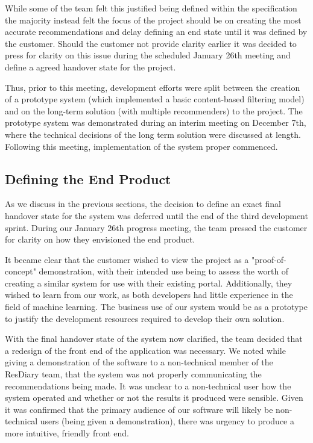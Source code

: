 \documentclass{l3proj}
\begin{document}
While some of the team felt this justified being defined within the specification the majority instead felt the focus of the project should be on creating the most accurate recommendations and delay defining an end state until it was defined by the customer. Should the customer not provide clarity earlier it was decided to press for clarity on this issue during the scheduled January 26th meeting and define a agreed handover state for the project. 

Thus, prior to this meeting, development efforts were split between the creation of a prototype system (which implemented a basic content-based filtering model) and on the long-term solution (with multiple recommenders) to the project. The prototype system was demonstrated during an interim meeting on December 7th, where the technical decisions of the long term solution were discussed at length. Following this meeting, implementation of the system proper commenced. 

\subsection{Defining the End Product}
\label{sec:jandefinedstate}

As we discuss in the previous sections, the decision to define an exact final handover state for the system was deferred until the end of the third development sprint. During our January 26th progress meeting, the team pressed the customer for clarity on how they envisioned the end product. 

It became clear that the customer wished to view the project as a "proof-of-concept" demonstration, with their intended use being to assess the worth of creating a similar system for use with their existing portal. Additionally, they wished to learn from our work, as both developers had little experience in the field of machine learning. The business use of our system would be as a prototype to justify the development resources required to develop their own solution.

With the final handover state of the system now clarified, the team decided that a redesign of the front end of the application was necessary. We noted while giving a demonstration of the software to a non-technical member of the ResDiary team, that the system was not properly communicating the recommendations being made. It was unclear to a non-technical user how the system operated and whether or not the results it produced were sensible. Given it was confirmed that the primary audience of our software will likely be non-technical users (being given a demonstration), there was urgency to produce a more intuitive, friendly front end. 
\end{document}
